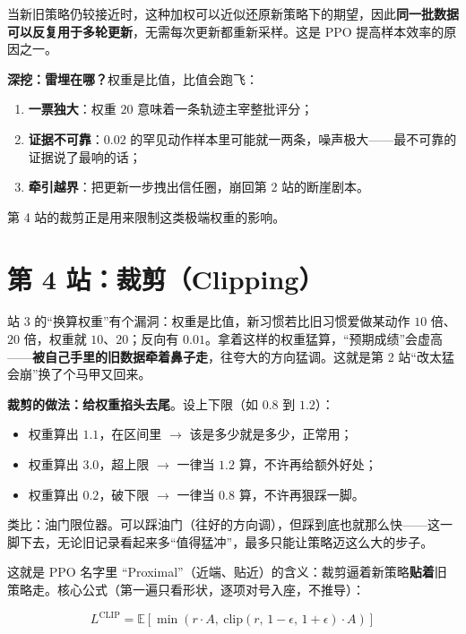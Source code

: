 \documentclass[UTF8,12pt,a4paper]{ctexrep}
\newcommand{\plain}[1]{\begin{plainbox}#1\end{plainbox}}
\begin{document}
当新旧策略仍较接近时，这种加权可以近似还原新策略下的期望，因此\textbf{同一批数据可以反复用于多轮更新}，无需每次更新都重新采样。这是 PPO 提高样本效率的原因之一。

\textbf{深挖：雷埋在哪？}权重是比值，比值会跑飞：

\begin{enumerate}[nosep]
  \item \textbf{一票独大}：权重 $20$ 意味着一条轨迹主宰整批评分；
  \item \textbf{证据不可靠}：$0.02$ 的罕见动作样本里可能就一两条，噪声极大——最不可靠的证据说了最响的话；
  \item \textbf{牵引越界}：把更新一步拽出信任圈，崩回第 2 站的断崖剧本。
\end{enumerate}

第 4 站的裁剪正是用来限制这类极端权重的影响。

\section{第 4 站：裁剪（Clipping）}

站 3 的``换算权重''有个漏洞：权重是比值，新习惯若比旧习惯爱做某动作 $10$ 倍、$20$ 倍，权重就 $10$、$20$；反向有 $0.01$。拿着这样的权重猛算，``预期成绩''会虚高——\textbf{被自己手里的旧数据牵着鼻子走}，往夸大的方向猛调。这就是第 2 站``改太猛会崩''换了个马甲又回来。

\textbf{裁剪的做法：给权重掐头去尾}。设上下限（如 $0.8$ 到 $1.2$）：

\begin{itemize}[nosep]
  \item 权重算出 $1.1$，在区间里 $\to$ 该是多少就是多少，正常用；
  \item 权重算出 $3.0$，超上限 $\to$ 一律当 $1.2$ 算，不许再给额外好处；
  \item 权重算出 $0.2$，破下限 $\to$ 一律当 $0.8$ 算，不许再狠踩一脚。
\end{itemize}

\plain{类比：油门限位器。可以踩油门（往好的方向调），但踩到底也就那么快——这一脚下去，无论旧记录看起来多``值得猛冲''，最多只能让策略迈这么大的步子。}

这就是 PPO 名字里 ``Proximal''（近端、贴近）的含义：裁剪逼着新策略\textbf{贴着}旧策略走。核心公式（第一遍只看形状，逐项对号入座，不推导）：

$$
L^{\mathrm{CLIP}} = \mathbb{E}\left[\min\left(r \cdot A,\ \mathrm{clip}(r,\, 1-\epsilon,\, 1+\epsilon) \cdot A\right)\right]
$$
\end{document}
